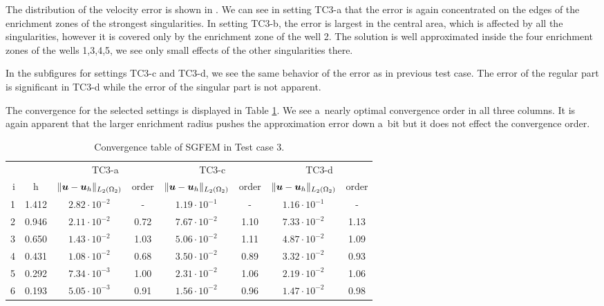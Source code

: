 %

The distribution of the velocity error is shown in . 
We can see in setting TC3-a that the error is again concentrated on the edges of the enrichment zones of
the strongest singularities. In setting TC3-b, the error is largest in the central area, 
which is affected by all the singularities, however it is covered only by the enrichment zone of the well 2.
The solution is well approximated inside the four enrichment zones
of the wells 1,3,4,5, we see only small effects of the other singularities there.

In the subfigures for settings TC3-c and TC3-d, we see the same behavior of the error as in previous test case.
The error of the regular part is significant in TC3-d while the error of the singular part is not apparent.

The convergence for the selected settings is displayed in Table \ref{tab:mh_tc3_convergence}.
We see a~nearly optimal convergence order in all three columns. It is again apparent that
the larger enrichment radius pushes the approximation error down a~bit but it does not effect the
convergence order.

\begin{table}[!htb]
\begin{center}
\bgroup
\def\arraystretch{1.2}
\setlength\tabcolsep{5pt}
\begin{tabular}{rc|cc|cc|cc}
\toprule
\multicolumn{2}{c|}{} & \multicolumn{2}{c|}{ TC3-a } & \multicolumn{2}{c|}{ TC3-c } & \multicolumn{2}{c}{TC3-d}\\ [3pt] %
i & h & $\|\mathbf{\boldsymbol{u}}-\mathbf{\boldsymbol{u}}_h\|_{L_2(\Omega_2)}$ & order & $\|\mathbf{\boldsymbol{u}}-\mathbf{\boldsymbol{u}}_h\|_{L_2(\Omega_2)}$
    & order & $\|\mathbf{\boldsymbol{u}}-\mathbf{\boldsymbol{u}}_h\|_{L_2(\Omega_2)}$ & order \\ [3pt] \midrule
1 & 1.412 & $2.82\cdot10^{-2}$  &  -   & $1.19\cdot10^{-1}$  &  -   & $1.16\cdot10^{-1}$ &   -   \\
2 & 0.946 & $2.11\cdot10^{-2}$  & 0.72 & $7.67\cdot10^{-2}$  & 1.10 & $7.33\cdot10^{-2}$ &  1.13 \\
3 & 0.650 & $1.43\cdot10^{-2}$  & 1.03 & $5.06\cdot10^{-2}$  & 1.11 & $4.87\cdot10^{-2}$ &  1.09 \\
4 & 0.431 & $1.08\cdot10^{-2}$  & 0.68 & $3.50\cdot10^{-2}$  & 0.89 & $3.32\cdot10^{-2}$ &  0.93 \\
5 & 0.292 & $7.34\cdot10^{-3}$  & 1.00 & $2.31\cdot10^{-2}$  & 1.06 & $2.19\cdot10^{-2}$ &  1.06 \\
6 & 0.193 & $5.05\cdot10^{-3}$  & 0.91 & $1.56\cdot10^{-2}$  & 0.96 & $1.47\cdot10^{-2}$ &  0.98 \\
\bottomrule
\end{tabular}
\caption{Convergence table of SGFEM in Test case 3.}
\label{tab:mh_tc3_convergence}
\egroup
\end{center}
\end{table}

